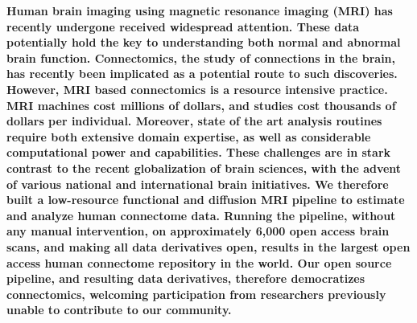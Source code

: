 \documentclass[11pt]{article}
\begin{document}
\noindent
\textbf{%
Human brain imaging using magnetic resonance imaging (MRI) has recently undergone received widespread attention.  These data potentially hold the key to understanding both normal and abnormal brain function.  Connectomics, the study of connections in the brain, has recently been implicated as a potential route to such discoveries.  However, MRI based connectomics is a resource intensive practice.  MRI machines cost millions of dollars, and  studies cost thousands of dollars per individual.  Moreover, state of the art analysis routines require both extensive domain expertise, as well as considerable computational power and capabilities.  These challenges are in stark contrast to the recent globalization of brain sciences, with the advent of various national and international brain initiatives.  We therefore built a low-resource functional and diffusion MRI pipeline to estimate and analyze human connectome data.  Running the pipeline, without any manual intervention, on approximately 6,000 open access brain scans, and making all data derivatives open, results in the largest open access human connectome repository in the world.  Our open source pipeline, and resulting data derivatives, therefore democratizes connectomics, welcoming participation from researchers previously unable to contribute to our community.
}
\end{document}
